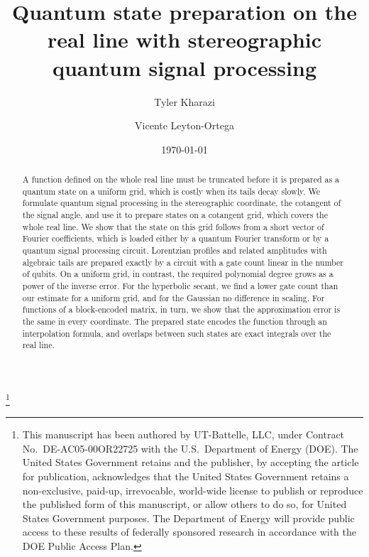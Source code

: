 \documentclass[
    reprint,
    amsmath,amssymb,
    aps,
    pra,
    superscriptaddress,
    floatfix
]{revtex4-2}
\theoremstyle{aps}
\begin{document}
\title{Quantum state preparation on the real line with stereographic quantum signal processing}

\thanks{This manuscript has been authored by UT-Battelle, LLC, under Contract No.\ DE-AC05-00OR22725 with the U.S.\ Department of Energy (DOE). The United States Government retains and the publisher, by accepting the article for publication, acknowledges that the United States Government retains a non-exclusive, paid-up, irrevocable, world-wide license to publish or reproduce the published form of this manuscript, or allow others to do so, for United States Government purposes. The Department of Energy will provide public access to these results of federally sponsored research in accordance with the DOE Public Access Plan.}

\author{Tyler Kharazi}

\author{Vicente Leyton-Ortega}

\date{\today}

\begin{abstract}
	A function defined on the whole real line must be truncated
	before it is prepared as a quantum state on a uniform grid,
	which is costly when its tails decay slowly.  We formulate
	quantum signal processing in the stereographic coordinate, the
	cotangent of the signal angle, and use it to prepare states on a
	cotangent grid, which covers the whole real line.  We show that
	the state on this grid follows from a short vector of Fourier
	coefficients, which is loaded either by a quantum Fourier
	transform or by a quantum signal processing circuit.  Lorentzian
	profiles and related amplitudes with algebraic tails are
	prepared exactly by a circuit with a gate count linear in the
	number of qubits.  On a uniform grid, in contrast, the required
	polynomial degree grows as a power of the inverse error.  For
	the hyperbolic secant, we find a lower gate count than our
	estimate for a uniform grid, and for the Gaussian no difference
	in scaling.  For functions of a block-encoded matrix, in turn,
	we show that the approximation error is the same in every
	coordinate.  The prepared state encodes the function through an
	interpolation formula, and overlaps between such states are
	exact integrals over the real line.
\end{abstract}
\end{document}
